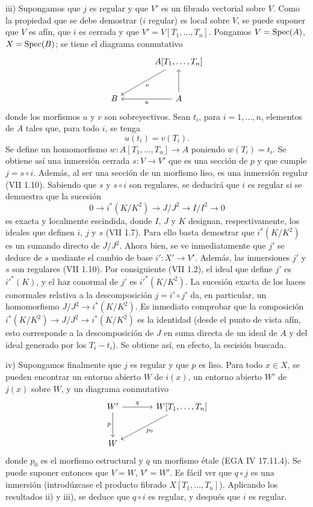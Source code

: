 iii) Supongamos que $j$ es regular y que $V'$ es un fibrado vectorial sobre
$V$. Como la propiedad que se debe demostrar ($i$ regular) es local sobre
$V$, se puede suponer que $V$ es afín, que $i$ es cerrada y que
$V'=V[T_1,\ldots,T_n]$. Pongamos $V=\operatorname{Spec}(A)$, $X=\operatorname{Spec}(B)$; se tiene el
diagrama conmutativo
\[
\begin{tikzcd}[column sep=large,row sep=large]
& A[T_1,\ldots,T_n] \arrow[dl,"v"]\\
B & A \arrow[l,"u"] \arrow[u]
\end{tikzcd}
\]
donde los morfismos $u$ y $v$ son sobreyectivos. Sean $t_i$, para
$i=1,\ldots,n$, elementos de $A$ tales que, para todo $i$, se tenga
\[
u(t_i)=v(T_i).
\]
Se define un homomorfismo $w:A[T_1,\ldots,T_n]\longrightarrow A$ poniendo
$w(T_i)=t_i$. Se obtiene así una inmersión cerrada $s:V\to V'$ que es una
sección de $p$ y que cumple $j=s\circ i$. Además, al ser una sección de un
morfismo liso, es una inmersión regular (VII 1.10). Sabiendo que $s$ y
$s\circ i$ son regulares, se deducirá que $i$ es regular si se demuestra que
la sucesión
\[
0\longrightarrow i^*(K/K^2)\longrightarrow J/J^2\longrightarrow I/I^2\longrightarrow0
\]
es exacta y localmente escindida, donde $I$, $J$ y $K$ designan,
respectivamente, los ideales que definen $i$, $j$ y $s$ (VII 1.7). Para ello
basta demostrar que $i^*(K/K^2)$ es un sumando directo de $J/J^2$. Ahora bien,
se ve inmediatamente que $j'$ se deduce de $s$ mediante el cambio de base
$i':X'\to V'$. Además, las inmersiones $j'$ y $s$ son regulares (VII 1.10).
Por consiguiente (VII 1.2), el ideal que define $j'$ es $i'^*(K)$, y el haz
conormal de $j'$ es $i'^*(K/K^2)$. La sucesión exacta de los haces conormales
relativa a la descomposición $j=i'\circ j'$ da, en particular, un
homomorfismo $J/J^2\longrightarrow i^*(K/K^2)$. Es inmediato comprobar que la
composición
$i^*(K/K^2)\longrightarrow J/J^2\longrightarrow i^*(K/K^2)$ es la identidad
(desde el punto de vista afín, esto corresponde a la descomposición de $J$ en
suma directa de un ideal de $A$ y del ideal generado por los $T_i-t_i$). Se
obtiene así, en efecto, la escisión buscada.

iv) Supongamos finalmente que $j$ es regular y que $p$ es liso. Para todo
$x\in X$, se pueden encontrar un entorno abierto $W$ de $i(x)$, un entorno
abierto $W'$ de $j(x)$ sobre $W$, y un diagrama conmutativo
\[
\begin{tikzcd}[column sep=large,row sep=large]
W' \arrow[r,"q"] \arrow[d,"p"'] & W[T_1,\ldots,T_n] \arrow[dl,"p_0"]\\
W &
\end{tikzcd}
\]
donde $p_0$ es el morfismo estructural y $q$ un morfismo étale (EGA IV
17.11.4). Se puede suponer entonces que $V=W$, $V'=W'$. Es fácil ver que
$q\circ j$ es una inmersión (introdúzcase el producto fibrado
$X[T_1,\ldots,T_n]$). Aplicando los resultados ii) y iii), se deduce que
$q\circ i$ es regular, y después que $i$ es regular.

